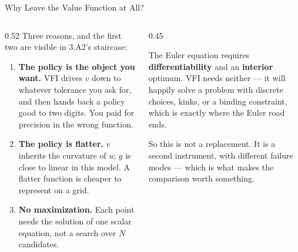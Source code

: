 \begin{frame}{Why Leave the Value Function at All?}
\begin{columns}[T]
\begin{column}{0.52\textwidth}
\small
Three reasons, and the first two are visible in 3.A2's staircase:
\medskip
\begin{enumerate}\footnotesize
  \item \textbf{The policy is the object you want.} VFI drives $v$ down to whatever tolerance you ask for, and then hands back a policy good to two digits. You paid for precision in the wrong function.
  \item \textbf{The policy is flatter.} $v$ inherits the curvature of $u$; $g$ is close to linear in this model. A flatter function is cheaper to represent on a grid.
  \item \textbf{No maximization.} Each point needs the solution of one scalar equation, not a search over $N$ candidates.
\end{enumerate}
\end{column}
\begin{column}{0.45\textwidth}
\begin{cautionbox}[title=\textbf{What you give up}]\footnotesize
The Euler equation requires \textbf{differentiability} and an \textbf{interior} optimum. VFI needs neither --- it will happily solve a problem with discrete choices, kinks, or a binding constraint, which is exactly where the Euler road ends.
\end{cautionbox}
\medskip
\begin{examplebox}\footnotesize
So this is not a replacement. It is a second instrument, with different failure modes --- which is what makes the comparison worth something.
\end{examplebox}
\end{column}
\end{columns}
\vspace{1mm}
\end{frame}

